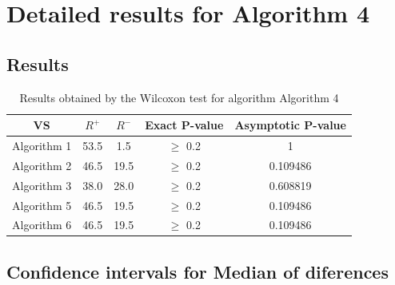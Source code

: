 \documentclass[a4paper,10pt]{article}
\begin{document}
 \clearpage 


\section{Detailed results for Algorithm 4}


\subsection{Results}

\begin{table}[!htp]
\centering\small
\begin{tabular}{
|c|c|c|c|c|}
\hline
 VS & $R^{+}$ & $R^{-}$ & Exact P-value & Asymptotic P-value \\ \hline 
Algorithm 1 & 53.5 & 1.5 & $\geq$ 0.2 & 1\\ \hline 
Algorithm 2 & 46.5 & 19.5 & $\geq$ 0.2 & 0.109486\\ \hline 
Algorithm 3 & 38.0 & 28.0 & $\geq$ 0.2 & 0.608819\\ \hline 
Algorithm 5 & 46.5 & 19.5 & $\geq$ 0.2 & 0.109486\\ \hline 
Algorithm 6 & 46.5 & 19.5 & $\geq$ 0.2 & 0.109486\\ \hline 

\end{tabular}
\caption{Results obtained by the Wilcoxon test for algorithm Algorithm 4}
\end{table}

\subsection{Confidence intervals for Median of diferences}
\end{document}
